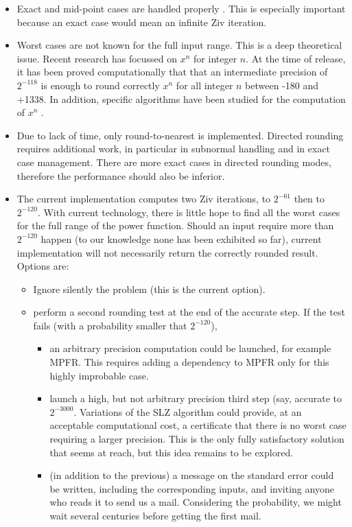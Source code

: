 \begin{itemize}
\item Exact and mid-point cases are handled properly
  \cite{LauterLefevre2007}. This is especially important because an
  exact case would mean an infinite Ziv iteration.

\item Worst cases are not known for the full input range. This is a
  deep theoretical issue. Recent research has focussed on $x^n$ for
  integer $n$. At the time of release, it has been proved
  computationally that that an intermediate precision of $2^{-118}$ is
  enough to round correctly $x^n$ for all integer $n$ between -180 and
  +1338. In addition, specific algorithms have been studied for the
  computation of $x^n$ \cite{KorLauLefLouvMul2008}.

\item Due to lack of time, only round-to-nearest is
  implemented. Directed rounding requires additional work, in
  particular in subnormal handling and in exact case management. There
  are more exact cases in directed rounding modes, therefore the
  performance should also be inferior.

\item The current implementation computes two Ziv iterations, to
  $2^{-61}$ then to $2^{-120}$. With current technology, there is
  little hope to find all the worst cases for the full range of the
  power function. Should an input require more than $2^{-120}$ happen
  (to our knowledge none has been exhibited so far), current
  implementation will not necessarily return the correctly rounded
  result. Options are:
  \begin{itemize}
  \item Ignore silently the problem (this is the current option).
  \item perform a second rounding test at the end of the accurate
    step. If the test fails (with a  probability
      smaller that $2^{-120}$),
    \begin{itemize}
    \item an arbitrary precision computation could be launched, for
      example MPFR. This requires adding a dependency to MPFR only for
      this highly improbable case.
    \item launch a high, but not arbitrary precision third step (say,
      accurate to $2^{-3000}$. Variations of the SLZ algorithm
      \cite{Stehle-thesis} could provide, at an acceptable
      computational cost, a certificate that there is no worst case
      requiring a larger precision. This is the only fully satisfactory solution that seems at reach, but this idea remains to be explored.
    \item (in addition to the previous) a message on the standard error could be written, including
      the corresponding inputs, and inviting anyone who reads it to
      send us a mail. Considering the probability, we might wait
      several centuries before getting the first mail.
    \end{itemize}


\end{itemize}
\end{itemize}
